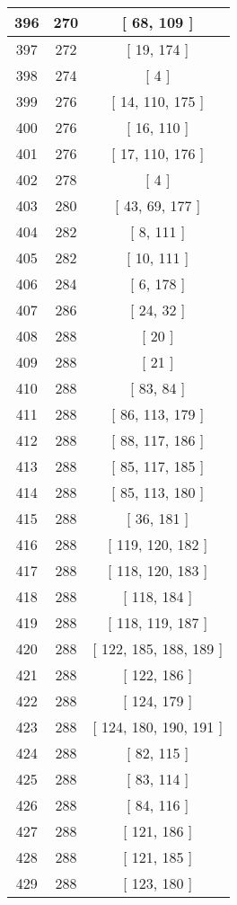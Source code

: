 \begin{center}
\begin{longtable}[H]{|| c c c ||}
\hline
396 & 270 & [ 68, 109 ] \\ 
\hline
397 & 272 & [ 19, 174 ] \\ 
\hline
398 & 274 & [ 4 ] \\ 
\hline
399 & 276 & [ 14, 110, 175 ] \\ 
\hline
400 & 276 & [ 16, 110 ] \\ 
\hline
401 & 276 & [ 17, 110, 176 ] \\ 
\hline
402 & 278 & [ 4 ] \\ 
\hline
403 & 280 & [ 43, 69, 177 ] \\ 
\hline
404 & 282 & [ 8, 111 ] \\ 
\hline
405 & 282 & [ 10, 111 ] \\ 
\hline
406 & 284 & [ 6, 178 ] \\ 
\hline
407 & 286 & [ 24, 32 ] \\ 
\hline
408 & 288 & [ 20 ] \\ 
\hline
409 & 288 & [ 21 ] \\ 
\hline
410 & 288 & [ 83, 84 ] \\ 
\hline
411 & 288 & [ 86, 113, 179 ] \\ 
\hline
412 & 288 & [ 88, 117, 186 ] \\ 
\hline
413 & 288 & [ 85, 117, 185 ] \\ 
\hline
414 & 288 & [ 85, 113, 180 ] \\ 
\hline
415 & 288 & [ 36, 181 ] \\ 
\hline
416 & 288 & [ 119, 120, 182 ] \\ 
\hline
417 & 288 & [ 118, 120, 183 ] \\ 
\hline
418 & 288 & [ 118, 184 ] \\ 
\hline
419 & 288 & [ 118, 119, 187 ] \\ 
\hline
420 & 288 & [ 122, 185, 188, 189 ] \\ 
\hline
421 & 288 & [ 122, 186 ] \\ 
\hline
422 & 288 & [ 124, 179 ] \\ 
\hline
423 & 288 & [ 124, 180, 190, 191 ] \\ 
\hline
424 & 288 & [ 82, 115 ] \\ 
\hline
425 & 288 & [ 83, 114 ] \\ 
\hline
426 & 288 & [ 84, 116 ] \\ 
\hline
427 & 288 & [ 121, 186 ] \\ 
\hline
428 & 288 & [ 121, 185 ] \\ 
\hline
429 & 288 & [ 123, 180 ] \\ 

\end{longtable}
\end{center}

